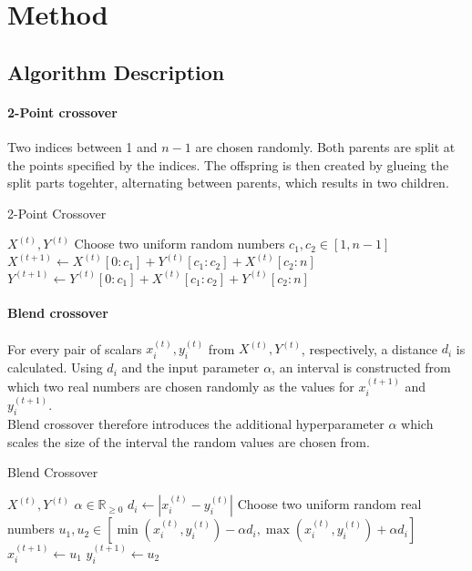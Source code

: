 \section{Method}
\subsection{Algorithm Description}
\paragraph{2-Point crossover}
Two indices between 1 and $n-1$ are chosen randomly.
Both parents are split at the points specified by the indices.
The offspring is then created by glueing the split parts togehter, alternating between parents, which results in two children.
\begin{algorithm}
\caption{2-Point Crossover}\label{alg:2px}
\begin{algorithmic}

\Require $X^{(t)}, Y^{(t)}$
\State Choose two uniform random numbers $c_1, c_2 \in [1, n-1]$
\State $X^{(t+1)} \gets X^{(t)}[0:c_1] + Y^{(t)}[c_1:c_2] + X^{(t)}[c_2:n]$
\State $Y^{(t+1)} \gets Y^{(t)}[0:c_1] + X^{(t)}[c_1:c_2] + Y^{(t)}[c_2:n]$

\end{algorithmic}
\end{algorithm}


\paragraph{Blend crossover}
For every pair of scalars $x_i^{(t)}, y_i^{(t)}$ from $X^{(t)}, Y^{(t)}$, respectively, a distance $d_i$ is calculated.
Using $d_i$ and the input parameter $\alpha$, an interval is constructed from which two real numbers are chosen randomly as the values for $x_i^{(t+1)}$ and $y_i^{(t+1)}$. \\
Blend crossover therefore introduces the additional hyperparameter $\alpha$ which scales the size of the interval the random values are chosen from.
\begin{algorithm}
\caption{Blend Crossover}\label{alg:blendx}
\begin{algorithmic}

\Require $X^{(t)}, Y^{(t)}$
\Ensure $\alpha \in \mathbb{R}_{\geq 0}$
    \State $d_i \gets |x_i^{(t)} -  y_i^{(t)}|$
    \State Choose two uniform random real numbers
    \State $u_1, u_2 \in [\min(x_i^{(t)}, y_i^{(t)}) - \alpha d_i, \max(x_i^{(t)}, y_i^{(t)}) + \alpha d_i]$
    \State $x_i^{(t+1)} \gets u_1$
    \State $y_i^{(t+1)} \gets u_2$
\EndFor

\end{algorithmic}
\end{algorithm}

